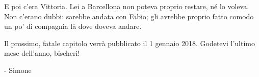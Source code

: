 E poi c'era Vittoria. Lei a Barcellona non poteva proprio restare, né lo voleva. Non c'erano dubbi: sarebbe andata con Fabio; gli avrebbe proprio fatto comodo un po' di compagnia là dove doveva andare.

Il prossimo, fatale capitolo verrà pubblicato il 1 gennaio 2018. Godetevi l'ultimo mese dell'anno, bischeri!

- Simone



